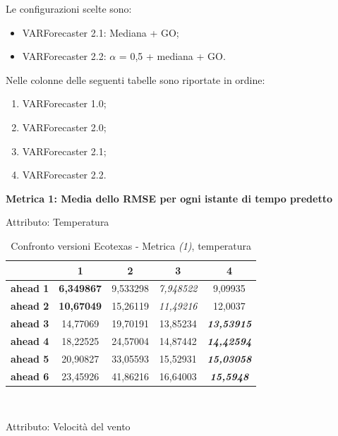 \documentclass[12pt,a4paper,oneside,openright]{book}
\begin{document}
Le configurazioni scelte sono:
\begin{itemize}
\item VARForecaster 2.1: Mediana + GO;
\item VARForecaster 2.2: $\alpha$ = 0,5 + mediana + GO.
\end{itemize}

Nelle colonne delle seguenti tabelle sono riportate in ordine:
\begin{enumerate}
\item VARForecaster 1.0;
\item VARForecaster 2.0;
\item VARForecaster 2.1;
\item VARForecaster 2.2.
\end{enumerate}

\medskip

\textbf{Metrica 1: Media dello RMSE per ogni istante di tempo predetto} 

\medskip

Attributo: Temperatura \\ 

\begin{table}[H]
\centering
\begin{tabular}{|c|c|c|c|c|}
\hline
& 1 & 2 & 3 & 4 \\
\hline
\textbf{ahead 1} & \textbf{6,349867} & 9,533298 & \textit{7,948522} & 9,09935\\
\hline
\textbf{ahead 2} & \textbf{10,67049} & 15,26119 & \textit{11,49216} & 12,0037\\ 
\hline
\textbf{ahead 3} & 14,77069 & 19,70191 & 13,85234 & \textit{\textbf{13,53915}}\\
\hline
\textbf{ahead 4} & 18,22525 & 24,57004 & 14,87442 & \textit{\textbf{14,42594}}\\ 
\hline
\textbf{ahead 5} & 20,90827 & 33,05593 & 15,52931 & \textit{\textbf{15,03058}}\\
\hline
\textbf{ahead 6} & 23,45926 & 41,86216 & 16,64003 & \textit{\textbf{15,5948}}\\ 
\hline
\end{tabular} \\
\caption{Confronto versioni Ecotexas - Metrica \textit{(1)}, temperatura}
\end{table} 

\newpage

Attributo: Velocità del vento \\ 
\end{document}

